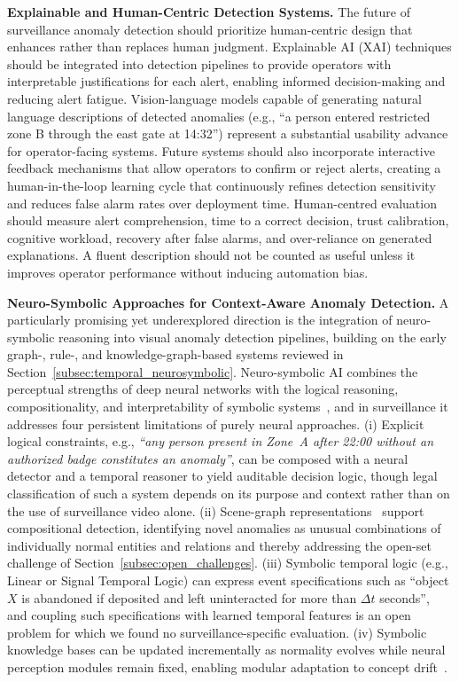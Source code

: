 \documentclass[10pt,a4paper]{article}
\begin{document}
\noindent\textbf{Explainable and Human-Centric Detection Systems.} The future of surveillance anomaly detection should prioritize human-centric design that enhances rather than replaces human judgment. Explainable AI (XAI) techniques should be integrated into detection pipelines to provide operators with interpretable justifications for each alert, enabling informed decision-making and reducing alert fatigue. Vision-language models capable of generating natural language descriptions of detected anomalies (e.g., ``a person entered restricted zone B through the east gate at 14:32'') represent a substantial usability advance for operator-facing systems. Future systems should also incorporate interactive feedback mechanisms that allow operators to confirm or reject alerts, creating a human-in-the-loop learning cycle that continuously refines detection sensitivity and reduces false alarm rates over deployment time. Human-centred evaluation should measure alert comprehension, time to a correct decision, trust calibration, cognitive workload, recovery after false alarms, and over-reliance on generated explanations. A fluent description should not be counted as useful unless it improves operator performance without inducing automation bias.

\noindent\textbf{Neuro-Symbolic Approaches for Context-Aware Anomaly Detection.} A particularly promising yet underexplored direction is the integration of neuro-symbolic reasoning into visual anomaly detection pipelines, building on the early graph-, rule-, and knowledge-graph-based systems reviewed in Section~\ref{subsec:temporal_neurosymbolic}. Neuro-symbolic AI combines the perceptual strengths of deep neural networks with the logical reasoning, compositionality, and interpretability of symbolic systems~\citep{garcez2023neurosymbolic, hitzler2022neurosymbolic}, and in surveillance it addresses four persistent limitations of purely neural approaches. (i) Explicit logical constraints, e.g., \textit{``any person present in Zone~A after 22:00 without an authorized badge constitutes an anomaly''}, can be composed with a neural detector and a temporal reasoner to yield auditable decision logic, though legal classification of such a system depends on its purpose and context rather than on the use of surveillance video alone. (ii) Scene-graph representations~\citep{ji2020action, chang2021comprehensive, cong2023reltr} support compositional detection, identifying novel anomalies as unusual combinations of individually normal entities and relations and thereby addressing the open-set challenge of Section~\ref{subsec:open_challenges}. (iii) Symbolic temporal logic (e.g., Linear or Signal Temporal Logic) can express event specifications such as ``object $X$ is abandoned if deposited and left uninteracted for more than $\Delta t$ seconds'', and coupling such specifications with learned temporal features is an open problem for which we found no surveillance-specific evaluation. (iv) Symbolic knowledge bases can be updated incrementally as normality evolves while neural perception modules remain fixed, enabling modular adaptation to concept drift~\citep{mao2019neuro}.
\end{document}

